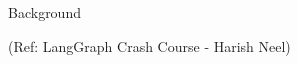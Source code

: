 


\begin{frame}[fragile]\frametitle{}
\begin{center}
{\Large Background}

{\tiny (Ref: LangGraph Crash Course - Harish Neel)}

\end{center}
\end{frame}


